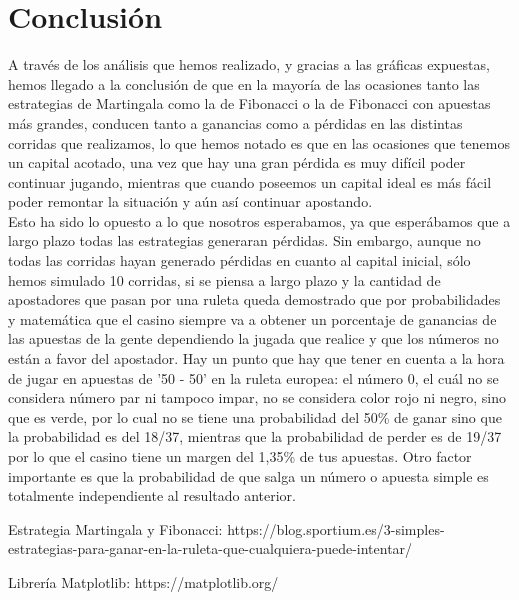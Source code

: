 \documentclass{article}
\begin{document}
\section{Conclusión}
A través de los análisis que hemos realizado, y gracias a las gráficas expuestas, hemos llegado a la conclusión de que en la mayoría de las ocasiones tanto las estrategias de Martingala como la de Fibonacci o la de Fibonacci con apuestas más grandes, conducen tanto a ganancias como a pérdidas en las distintas corridas que realizamos, lo que hemos notado es que en las ocasiones que tenemos un capital acotado, una vez que hay una gran pérdida es muy difícil poder continuar jugando, mientras que cuando poseemos un capital ideal es más fácil poder remontar la situación y aún así continuar apostando.\\
Esto ha sido lo opuesto a lo que nosotros esperabamos, ya que  esperábamos que a largo plazo todas las estrategias generaran pérdidas. Sin embargo, aunque no todas las corridas hayan generado pérdidas en cuanto al capital inicial, sólo hemos simulado 10 corridas, si se piensa a largo plazo y la cantidad de apostadores que pasan por una ruleta queda demostrado que por probabilidades y matemática que el casino siempre va a obtener un porcentaje de ganancias de las apuestas de la gente dependiendo la jugada que realice y que los números no están a favor del apostador.
Hay un punto que hay que tener en cuenta a la hora de jugar en apuestas de '50 - 50' en la ruleta europea: el número 0, el cuál no se considera número par ni tampoco impar, no se considera color rojo ni negro, sino que es verde, por lo cual no se tiene una probabilidad del 50\% de ganar sino que la probabilidad es del 18/37, mientras que la probabilidad de perder es de 19/37 por lo que el casino tiene un margen del 1,35\% de tus apuestas.
Otro factor importante es que la probabilidad de que salga un número o apuesta simple es totalmente independiente al resultado anterior. 


 


\begin{thebibliography}{1}

Estrategia Martingala y Fibonacci:
\newblock https://blog.sportium.es/3-simples-estrategias-para-ganar-en-la-ruleta-que-cualquiera-puede-intentar/

Librería Matplotlib:
\newblock https://matplotlib.org/

\end{thebibliography}
\end{document}
